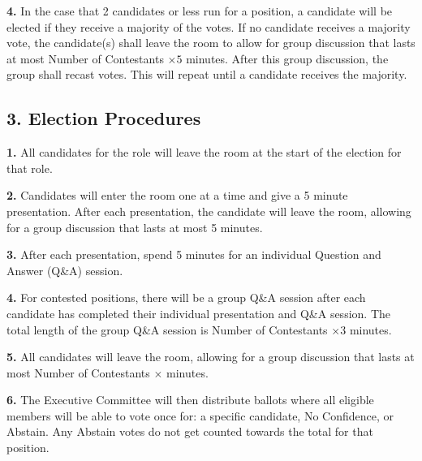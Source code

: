 \documentclass{article}
\begin{document}
\textbf{4.} In the case that 2 candidates or less run for a position, a candidate will be elected if they receive a majority of the votes. If no candidate receives a majority vote, the candidate(s) shall leave the room to allow for group discussion that lasts at most Number of Contestants $\times 5$ minutes. After this group discussion, the group shall recast votes. This will repeat until a candidate receives the majority.  

\subsection{3. Election Procedures}

\textbf{1.} All candidates for the role will leave the room at the start of the election for that role. 

\textbf{2.} Candidates will enter the room one at a time and give a 5 minute presentation. After each presentation, the candidate will leave the room, allowing for a group discussion that lasts at most 5 minutes.

\textbf{3.} After each presentation, spend 5 minutes for an individual Question and Answer (Q\&A) session.

\textbf{4.} For contested positions, there will be a group Q\&A session after each candidate has completed their individual presentation and Q\&A session. The total length of the group Q\&A session is Number of Contestants $\times 3$ minutes.

\textbf{5.} All candidates will leave the room, allowing for a group discussion that lasts at most Number of Contestants $\times $ minutes. 

\textbf{6.} The Executive Committee will then distribute ballots where all eligible members will be able to vote once for: a specific candidate, No Confidence, or Abstain. Any Abstain votes do not get counted towards the total for that position. 
\end{document}
